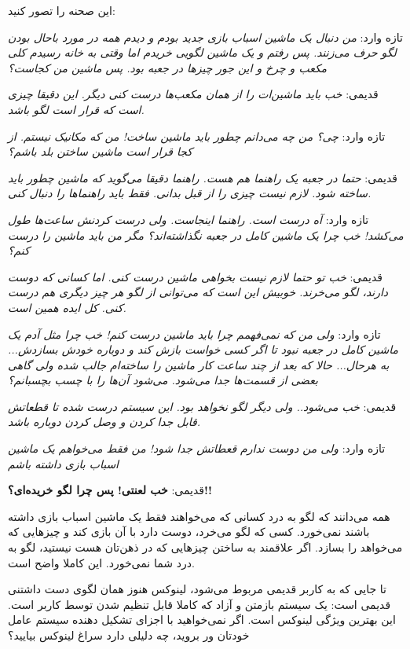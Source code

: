 این صحنه را تصور کنید:
\begin{mdframed}
\hspace{0.5cm}
تازه وارد:
\emph{من دنبال یک ماشین اسباب بازی جدید بودم و دیدم همه در مورد باحال بودن لگو حرف می‌زنند. پس رفتم و یک ماشین لگویی خریدم اما وقتی به خانه رسیدم کلی مکعب و چرخ و این جور چیزها در جعبه بود. پس ماشین من کجاست؟}

قدیمی:
\emph{خب باید ماشین‌ات را از همان مکعب‌ها درست کنی دیگر. این دقیقا چیزی است که قرار است لگو باشد.}

تازه وارد:
\emph{چی؟ من چه می‌دانم چطور باید ماشین ساخت! من که مکانیک نیستم. از کجا قرار است ماشین ساختن بلد باشم؟}

قدیمی:
\emph{حتما در جعبه یک راهنما هم هست. راهنما دقیقا می‌گوید که ماشین چطور باید ساخته شود. لازم نیست چیزی را از قبل بدانی. فقط باید راهنماها را دنبال کنی.}

تازه وارد:
\emph{آه درست است. راهنما اینجاست. ولی درست کردنش ساعت‌ها طول می‌کشد! خب چرا یک ماشین کامل در جعبه نگذاشته‌اند؟ مگر من باید ماشین را درست کنم؟}

قدیمی:
\emph{خب تو حتما لازم نیست بخواهی ماشین درست کنی. اما کسانی که دوست دارند، لگو می‌خرند. خوبیش این است که می‌توانی از لگو هر چیز دیگری هم درست کنی. کل ایده همین است.}

تازه وارد:
\emph{ولی من که نمی‌فهمم چرا باید ماشین درست کنم! خب چرا مثل آدم یک ماشین کامل در جعبه نبود تا اگر کسی خواست بازش کند و دوباره خودش بسازدش... به هرحال... حالا که بعد از چند ساعت کار ماشین را ساخته‌ام جالب شده ولی گاهی بعضی از قسمت‌ها جدا می‌شود. می‌شود آن‌ها را با چسب بچسبانم؟}

قدیمی:
\emph{خب می‌شود.. ولی دیگر لگو نخواهد بود. این سیستم درست شده تا قطعاتش قابل جدا کردن و وصل کردن دوباره باشد.}

تازه وارد:
\emph{ولی من دوست ندارم قعطاتش جدا شود! من فقط می‌خواهم یک ماشین اسباب بازی داشته باشم}

قدیمی:
\textbf{خب لعنتی! پس چرا لگو خریده‌ای؟!!}
\end{mdframed}

همه می‌دانند که لگو به درد کسانی که می‌خواهند فقط یک ماشین اسباب بازی داشته باشند نمی‌خورد. کسی که لگو می‌خرد،‌ دوست دارد با آن بازی کند و چیزهایی که می‌خواهد را بسازد. اگر علاقمند به ساختن چیزهایی که در ذهن‌تان هست نیستید، لگو به درد شما نمی‌خورد. این کاملا واضح است.

تا جایی که به کاربر قدیمی مربوط می‌شود،‌ لینوکس هنوز همان لگوی دست داشتنی قدیمی است: یک سیستم بازمتن و آزاد که کاملا قابل تنظیم شدن توسط کاربر است. این بهترین ویژگی لینوکس است. اگر نمی‌خواهید با اجزای تشکیل دهنده سیستم عامل خودتان ور بروید،‌ چه دلیلی دارد سراغ لینوکس بیایید؟

